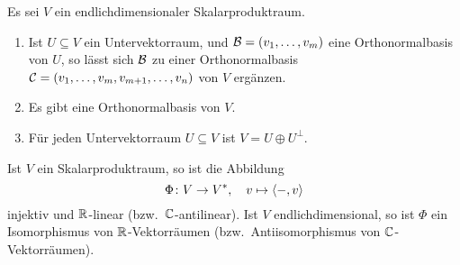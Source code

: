 \begin{corollary}
  Es sei $V$ ein endlichdimensionaler Skalarproduktraum.
  \begin{enumerate}[leftmargin=*]
    \item
      Ist $U \subseteq V$ ein Untervektorraum, und $\mathcal{B} = (v_1, \dotsc, v_m)$ eine Orthonormalbasis von $U$, so lässt sich $\mathcal{B}$ zu einer Orthonormalbasis $\mathcal{C} = (v_1, \dotsc, v_m, v_{m+1}, \dotsc, v_n)$ von $V$ ergänzen.
    \item
      Es gibt eine Orthonormalbasis von $V$.
    \item
      Für jeden Untervektorraum $U \subseteq V$ ist $V = U \oplus U^\perp$.
  \end{enumerate}
\end{corollary}


\begin{proposition}
  Ist $V$ ein Skalarproduktraum, so ist die Abbildung
  \[
    \Phi \colon V \to V^*,
    \quad
    v \mapsto \left\langle -, v \right\rangle
  \]
  injektiv und $\mathbb{R}$-linear (bzw.\ $\mathbb{C}$-antilinear).
  Ist $V$ endlichdimensional, so ist $\Phi$ ein Isomorphismus von $\mathbb{R}$-Vektorräumen (bzw.\ Antiisomorphismus von $\mathbb{C}$-Vektorräumen).
\end{proposition}
















